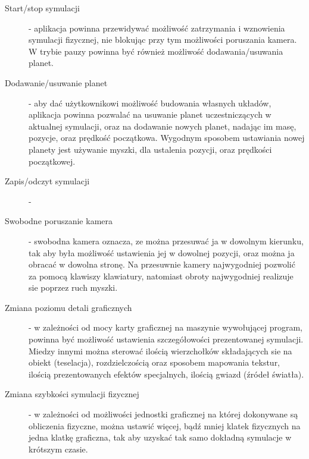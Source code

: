 \begin{description}
	\item[Start/stop symulacji] - aplikacja powinna przewidywać możliwość zatrzymania i wznowienia symulacji fizycznej, nie blokując przy tym możliwości poruszania kamera. W trybie pauzy powinna być również możliwość dodawania/usuwania planet.
	\item[Dodawanie/usuwanie planet] - aby dać użytkownikowi możliwość budowania własnych układów, aplikacja powinna pozwalać na usuwanie planet uczestniczących w aktualnej symulacji, oraz na dodawanie nowych planet, nadając im masę, pozycje, oraz prędkość początkowa. Wygodnym sposobem ustawiania nowej planety jest używanie myszki, dla ustalenia pozycji, oraz prędkości początkowej.
	\item[Zapis/odczyt symulacji] - 
	\item[Swobodne poruszanie kamera] - swobodna kamera oznacza, ze można przesuwać ja w dowolnym kierunku, tak aby była możliwość ustawienia jej w dowolnej pozycji, oraz można ja obracać w dowolna stronę. Na przesuwnie kamery najwygodniej pozwolić za pomocą klawiszy klawiatury, natomiast obroty najwygodniej realizuje sie poprzez ruch myszki.
	\item[Zmiana poziomu detali graficznych] - w zależności od mocy karty graficznej na maszynie wywołującej program, powinna być możliwość ustawienia szczegółowości prezentowanej symulacji. Miedzy innymi można sterować ilością wierzchołków składających sie na obiekt (teselacja), rozdzielczością oraz sposobem mapowania tekstur, ilością prezentowanych efektów specjalnych, ilością gwiazd (źródeł światła).
	\item[Zmiana szybkości symulacji fizycznej] - w zależności od możliwości jednostki graficznej na której dokonywane są obliczenia fizyczne, można ustawić więcej, bądź mniej klatek fizycznych na jedna klatkę graficzna, tak aby uzyskać tak samo dokładną symulacje w krótszym czasie.
\end{description}

